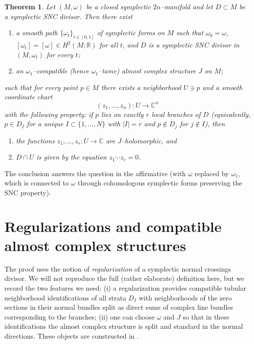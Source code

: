 \documentclass[11pt]{article}
\newtheorem{theorem}{Theorem}[section]
\theoremstyle{definition}
\begin{document}
\begin{theorem}\label{thm:main}
Let $(M,\omega)$ be a closed symplectic $2n$--manifold and let $D\subset M$ be a symplectic SNC divisor.
Then there exist
\begin{enumerate}
\item a smooth path $\{\omega_t\}_{t\in[0,1]}$ of symplectic forms on $M$ such that $\omega_0=\omega$, $[\omega_t]=[\omega]\in H^2(M;\mathbb R)$ for all $t$, and $D$ is a symplectic SNC divisor in $(M,\omega_t)$ for every $t$;
\item an $\omega_1$--compatible (hence $\omega_1$--tame) almost complex structure $J$ on $M$;
\end{enumerate}
such that for every point $p\in M$ there exists a neighborhood $U\ni p$ and a smooth coordinate chart
\[
(z_1,\dots,z_n):U\longrightarrow \mathbb C^n
\]
with the following property: if $p$ lies on exactly $r$ local branches of $D$ (equivalently, $p\in D_I$ for a unique $I\subset\{1,\dots,N\}$ with $|I|=r$ and $p\notin D_j$ for $j\notin I$), then
\begin{enumerate}
\item the functions $z_1,\dots,z_r:U\to\mathbb C$ are $J$--holomorphic, and
\item $D\cap U$ is given by the equation $z_1\cdots z_r=0$.
\end{enumerate}
\end{theorem}

The conclusion answers the question in the affirmative (with $\omega$ replaced by $\omega_1$, which is connected to $\omega$ through cohomologous symplectic forms preserving the SNC property).

\section{Regularizations and compatible almost complex structures}

The proof uses the notion of \emph{regularization} of a symplectic normal crossings divisor.  We will not reproduce the full (rather elaborate) definition here, but we record the two features we need: (i) a regularization provides compatible tubular neighborhood identifications of all strata $D_I$ with neighborhoods of the zero sections in their normal bundles split as direct sums of complex line bundles corresponding to the branches; (ii) one can choose $\omega$ and $J$ so that in these identifications the almost complex structure is split and standard in the normal directions.
These objects are constructed in \cite{FTZ}.
\end{document}
